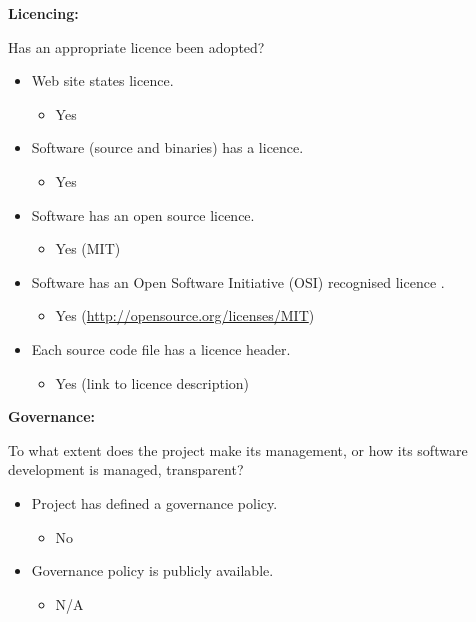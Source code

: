 \textbf{Licencing:}

Has an appropriate licence been adopted?

\begin{itemize}
\itemsep1pt\parskip0pt
\item
  Web site states licence.

  \begin{itemize}
  \itemsep1pt\parskip0pt
  \item
    Yes
  \end{itemize}
\item
  Software (source and binaries) has a licence.

  \begin{itemize}
  \itemsep1pt\parskip0pt
  \item
    Yes
  \end{itemize}
\item
  Software has an open source licence.

  \begin{itemize}
  \itemsep1pt\parskip0pt
  \item
    Yes (MIT)
  \end{itemize}
\item
  Software has an Open Software Initiative (OSI) recognised licence .

  \begin{itemize}
  \itemsep1pt\parskip0pt
  \item
    Yes (\url{http://opensource.org/licenses/MIT})
  \end{itemize}
\item
  Each source code file has a licence header.

  \begin{itemize}
  \itemsep1pt\parskip0pt
  \item
    Yes (link to licence description)
  \end{itemize}
\end{itemize}

\textbf{Governance:}

To what extent does the project make its management, or how its software
development is managed, transparent?

\begin{itemize}
\itemsep1pt\parskip0pt
\item
  Project has defined a governance policy.

  \begin{itemize}
  \itemsep1pt\parskip0pt
  \item
    No
  \end{itemize}
\item
  Governance policy is publicly available.

  \begin{itemize}
  \itemsep1pt\parskip0pt
  \item
    N/A
  \end{itemize}
\end{itemize}


